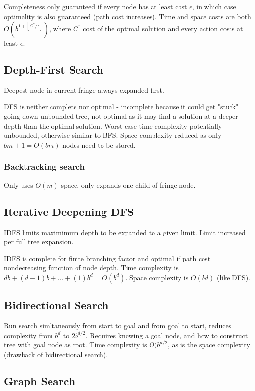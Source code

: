 \begin{multicols}{4}
Completeness only guaranteed if every node has at least cost $\epsilon$, in which case optimality is also guaranteed (path cost increases). Time and space costs are both $O(b^{1+[C^*/\epsilon]})$, where $C^*$ cost of the optimal solution and every action costs at least $\epsilon$.

\subsection{Depth-First Search}

Deepest node in current fringe always expanded first.

DFS is neither complete nor optimal - incomplete because it could get "stuck" going down unbounded tree, not optimal as it may find a solution at a deeper depth than the optimal solution. Worst-case time complexity potentially unbounded, otherwise similar to BFS.
Space complexity reduced as only $bm + 1 = O(bm)$ nodes need to be stored.

\subsubsection{Backtracking search}

Only uses $O(m)$ space, only expands one child of fringe node.

\subsection{Iterative Deepening DFS}

IDFS limits maximimum depth to be expanded to a given limit. Limit increased per full tree expansion.

IDFS is complete for finite branching factor and optimal if path cost nondecreasing function of node depth. Time complexity is $db + (d-1)b + \dots + (1)b^d = O(b^d)$. Space complexity is $O(bd)$ (like DFS).

\subsection{Bidirectional Search}

Run search simltaneously from start to goal and from goal to start, reduces complexity from $b^d$ to $2b^{d/2}$. Requires knowing a goal node, and how to construct tree with goal node as root. Time complexity is $O(b^{d/2}$, as is the space complexity (drawback of bidirectional search).

\subsection{Graph Search}


\end{multicols}

